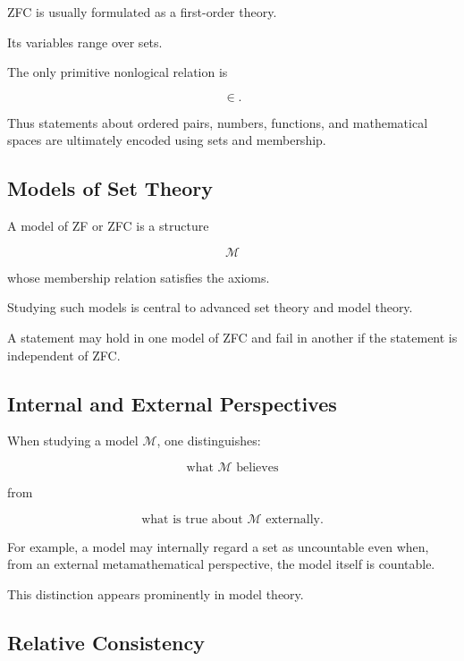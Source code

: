 ZFC is usually formulated as a first-order theory.

Its variables range over sets.

The only primitive nonlogical relation is

\[
\boxed{
\in.
}
\]

Thus statements about ordered pairs, numbers, functions, and mathematical
spaces are ultimately encoded using sets and membership.

\subsection{Models of Set Theory}
\label{subsec:models-of-set-theory}

A model of ZF or ZFC is a structure

\[
\mathcal{M}
\]

whose membership relation satisfies the axioms.

Studying such models is central to advanced set theory and model theory.

A statement may hold in one model of ZFC and fail in another if the
statement is independent of ZFC.

\subsection{Internal and External Perspectives}
\label{subsec:internal-external-set-theory}

When studying a model \(\mathcal{M}\), one distinguishes:

\[
\boxed{
\text{what \(\mathcal{M}\) believes}
}
\]

from

\[
\boxed{
\text{what is true about \(\mathcal{M}\) externally}.
}
\]

For example, a model may internally regard a set as uncountable even when,
from an external metamathematical perspective, the model itself is
countable.

This distinction appears prominently in model theory.

\subsection{Relative Consistency}
\label{subsec:relative-consistency}

